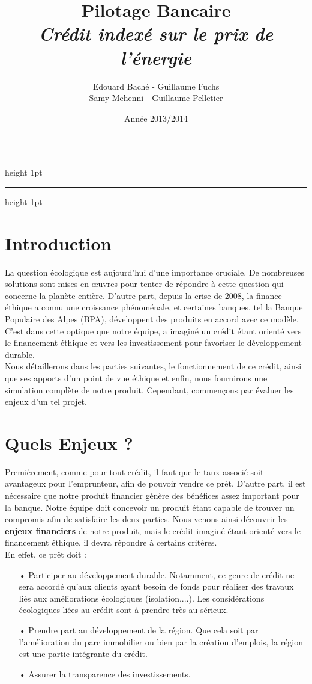 \documentclass[10pt,a4paper]{article}
\title{Pilotage Bancaire\\
{\em Crédit indexé sur le prix de l'énergie}}
\author{Edouard Baché - Guillaume Fuchs \\
Samy Mehenni - Guillaume Pelletier }
\date{Année 2013/2014}
\makeatletter
\def\thickhrulefill{\leavevmode \leaders \hrule height 1pt\hfill \kern \z@}
\def\maketitle{%
  \thispagestyle{empty}%
  \begin{center}
  \begin{flushleft}
  \normalfont\LARGE \par
	  \end{flushleft}
	\vskip 5cm
	  \leavevmode
	  \normalfont
	  \thickhrulefill\par
	  \vskip 0.2cm
	  {\huge\@title\par}%
	  \vskip 0.1cm
  \thickhrulefill\par
	  \vskip 1cm
	  {\Large \@date\par}%
  \vskip 12cm
  {\Large \@author\par}%
  \end{center}%
	  \clearpage
}
\makeatother
\begin{document}
\maketitle
\newpage
\tableofcontents
\newpage

\section{Introduction}
La question écologique est aujourd'hui d'une importance cruciale. De nombreuses solutions sont mises en œuvres pour tenter de répondre à cette question qui concerne la planète entière.
D'autre part, depuis la crise de 2008, la finance éthique a connu une croissance phénoménale, et certaines banques, tel la Banque Populaire des Alpes (BPA), développent des produits en accord avec ce modèle.
C'est dans cette optique que notre équipe, a imaginé un crédit étant orienté vers le financement éthique et vers les investissement pour favoriser le développement durable. \\
Nous détaillerons dans les parties suivantes, le fonctionnement de ce crédit, ainsi que ses apports d'un point de vue éthique et enfin, nous fournirons une simulation complète de notre produit. Cependant, commençons par évaluer les enjeux d'un tel projet.

\section{Quels Enjeux ?}
Premièrement, comme pour tout crédit, il faut que le taux associé soit avantageux pour l'emprunteur, afin de pouvoir vendre ce prêt. D'autre part, il est nécessaire que notre produit financier génère des bénéfices assez important pour la banque. Notre équipe doit concevoir un produit étant capable de trouver un compromis afin de satisfaire les deux parties. Nous venons ainsi découvrir les \textbf{enjeux financiers} de notre produit, mais le crédit imaginé étant orienté vers le financement éthique, il devra répondre à certains critères. \\
En effet, ce prêt doit : 
\begin{itemize}
\item[•] Participer au développement durable. Notamment, ce genre de crédit ne sera accordé qu'aux clients ayant besoin de fonds pour réaliser des travaux liés aux améliorations écologiques (isolation,...). Les considérations écologiques liées au crédit sont à prendre très au sérieux.
\item[•] Prendre part au développement de la région. Que cela soit par l'amélioration du parc immobilier ou bien par la création d'emplois, la région est une partie intégrante du crédit.
\item[•] Assurer la transparence des investissements.
\end{itemize}
\end{document}
